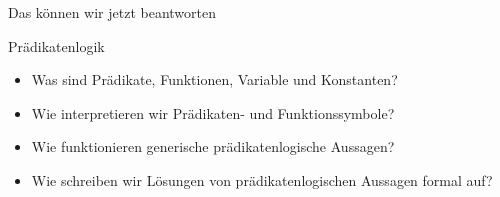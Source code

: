 \begin{frame}[fragile]{Das können wir jetzt beantworten}
	\begin{alertblock}{Prädikatenlogik}
		\begin{itemize}
			\item Was sind Prädikate, Funktionen, Variable und Konstanten?
			\item Wie interpretieren wir Prädikaten- und Funktionssymbole?
			\item Wie funktionieren generische prädikatenlogische Aussagen?
			\item Wie schreiben wir Lösungen von prädikatenlogischen Aussagen formal auf?
		\end{itemize}
	\end{alertblock}
\end{frame}